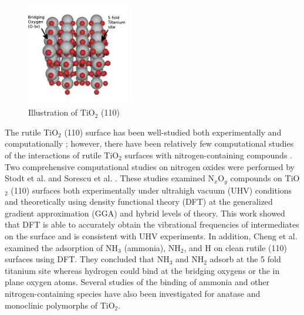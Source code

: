 \documentclass[journal=ascecg,manuscript=article,articletitle=true]{achemso}
\begin{document}
\begin{figure}[h]
\centering
\includegraphics[width=0.4\textwidth]{figures/slab_angle.png}
\caption{Illustration of TiO$_2$ (110)}
\label{fig:model_surface}
\end{figure}
The rutile TiO$_2$ (110) surface has been well-studied both experimentally \cite{Benkoula2015,Walle2009,Lu1994,Rusu2000,Rusu2001,Henderson_2011} and computationally \cite{Stodt2013,Sorescu2000,Cheng2011,Diebold_2003}; however, there have been relatively few computational studies of the interactions of rutile TiO$_2$ surfaces with nitrogen-containing compounds \cite{Stodt2013,Sorescu2000,Cheng2011}. Two comprehensive computational studies on nitrogen oxides were performed by Stodt et al. \cite{Stodt2013} and Sorescu et al. \cite{Sorescu2000}.  These studies examined N$_x$O$_y$ compounds on TiO$_2$ (110) surfaces both experimentally under ultrahigh vacuum (UHV) conditions and theoretically using density functional theory (DFT) at the generalized gradient approximation (GGA)\cite{Sorescu2000} and hybrid \cite{Stodt2013} levels of theory. This work showed that DFT is able to accurately obtain the vibrational frequencies of intermediates on the surface and is consistent with UHV experiments.
In addition, Cheng et al. \cite{Cheng2011} examined the adsorption of NH$_3$ (ammonia), NH$_2$, and H on clean rutile (110) surfaces using DFT. They concluded that NH$_3$ and NH$_2$ adsorb at the 5 fold titanium site whereas hydrogen could bind at the bridging oxygens or the in plane oxygen atoms. Several studies of the binding of ammonia and other nitrogen-containing species have also been investigated for anatase \cite{Onal_2006,Erdogan_2010,Erdogan_2011,Markovits_1996,Ji_2014} and monoclinic \cite{Guo_2012} polymorphs of TiO$_2$.
\end{document}
